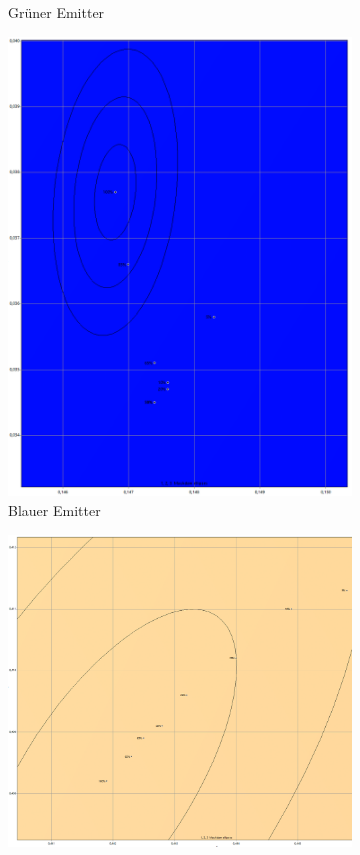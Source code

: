 \documentclass[11pt]{scrartcl}
\begin{document}
\begin{figure}[H]
\begin{subfigure}[b]{.49\textwidth}
        \caption{Grüner Emitter}
    \end{subfigure}
    \begin{subfigure}[b]{.49\textwidth}
        \includegraphics[width=\textwidth]{images/macAdam/skypanelBlue.png}
        \caption{Blauer Emitter}
    \end{subfigure}
    \hfill 
    \begin{subfigure}[b]{.49\textwidth}
        \includegraphics[width=\textwidth]{images/macAdam/skypanelWhite.png}

\end{subfigure}
\end{figure}
\end{document}
